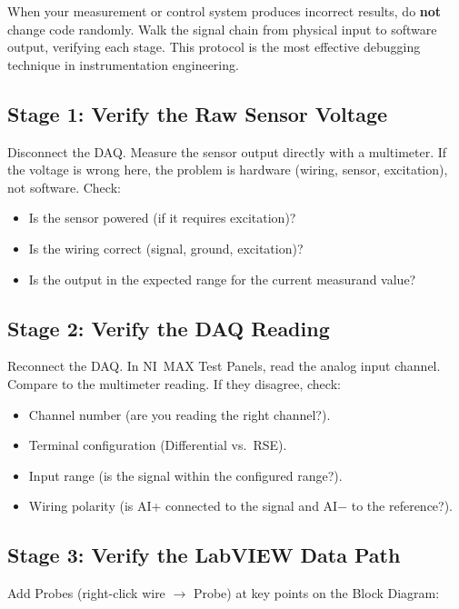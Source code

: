 When your measurement or control system produces incorrect results, do \textbf{not} change code randomly. Walk the signal chain from physical input to software output, verifying each stage. This protocol is the most effective debugging technique in instrumentation engineering.

\subsection{Stage 1: Verify the Raw Sensor Voltage}

Disconnect the DAQ. Measure the sensor output directly with a multimeter. If the voltage is wrong here, the problem is hardware (wiring, sensor, excitation), not software. Check:

\begin{itemize}[nosep,leftmargin=1.5em]
\item Is the sensor powered (if it requires excitation)?
\item Is the wiring correct (signal, ground, excitation)?
\item Is the output in the expected range for the current measurand value?
\end{itemize}

\subsection{Stage 2: Verify the DAQ Reading}

Reconnect the DAQ. In NI~MAX Test Panels, read the analog input channel. Compare to the multimeter reading. If they disagree, check:

\begin{itemize}[nosep,leftmargin=1.5em]
\item Channel number (are you reading the right channel?).
\item Terminal configuration (Differential vs.\ RSE).
\item Input range (is the signal within the configured range?).
\item Wiring polarity (is AI+ connected to the signal and AI$-$ to the reference?).
\end{itemize}

\subsection{Stage 3: Verify the LabVIEW Data Path}

Add Probes (right-click wire $\to$ Probe) at key points on the Block Diagram:

